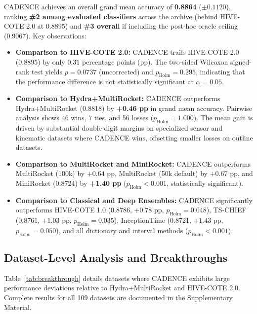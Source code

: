 \documentclass[journal,twocolumn]{article}
\begin{document}
CADENCE achieves an overall grand mean accuracy of \textbf{0.8864} ($\pm 0.1120$), ranking \textbf{\#2 among evaluated classifiers} across the archive (behind HIVE-COTE 2.0 at 0.8895) and \textbf{\#3 overall} if including the post-hoc oracle ceiling (0.9067). Key observations:
\begin{itemize}
    \item \textbf{Comparison to HIVE-COTE 2.0:} CADENCE trails HIVE-COTE 2.0 (0.8895) by only $0.31$ percentage points (pp). The two-sided Wilcoxon signed-rank test yields $p = 0.0737$ (uncorrected) and $p_{\text{Holm}} = 0.295$, indicating that the performance difference is not statistically significant at $\alpha = 0.05$.
    \item \textbf{Comparison to Hydra+MultiRocket:} CADENCE outperforms Hydra+MultiRocket (0.8818) by \textbf{+0.46 pp} in grand mean accuracy. Pairwise analysis shows 46 wins, 7 ties, and 56 losses ($p_{\text{Holm}} = 1.000$). The mean gain is driven by substantial double-digit margins on specialized sensor and kinematic datasets where CADENCE wins, offsetting smaller losses on outline datasets.
    \item \textbf{Comparison to MultiRocket and MiniRocket:} CADENCE outperforms MultiRocket (100k) by $+0.64$ pp, MultiRocket (50k default) by $+0.67$ pp, and MiniRocket (0.8724) by \textbf{+1.40 pp} ($p_{\text{Holm}} < 0.001$, statistically significant).
    \item \textbf{Comparison to Classical and Deep Ensembles:} CADENCE significantly outperforms HIVE-COTE 1.0 (0.8786, $+0.78$ pp, $p_{\text{Holm}} = 0.048$), TS-CHIEF (0.8761, $+1.03$ pp, $p_{\text{Holm}} = 0.035$), InceptionTime (0.8721, $+1.43$ pp, $p_{\text{Holm}} = 0.050$), and all dictionary and interval methods ($p_{\text{Holm}} < 0.001$).
\end{itemize}



\subsection{Dataset-Level Analysis and Breakthroughs}
Table~\ref{tab:breakthrough} details datasets where CADENCE exhibits large performance deviations relative to Hydra+MultiRocket and HIVE-COTE 2.0. Complete results for all 109 datasets are documented in the Supplementary Material.
\end{document}
